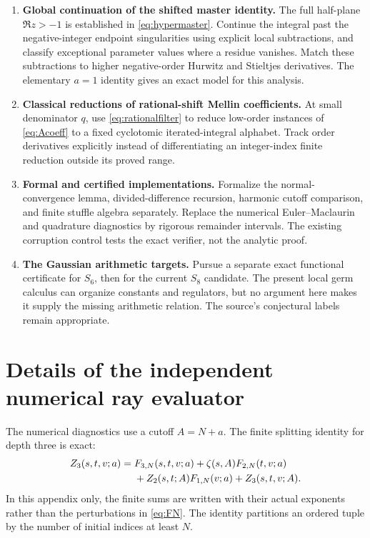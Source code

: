 \documentclass[11pt,a4paper]{article}
\numberwithin{equation}{section}
\theoremstyle{definition}\newtheorem{definition}[theorem]{Definition}
\theoremstyle{remark}\newtheorem{remark}[theorem]{Remark}
\begin{document}
\begin{enumerate}[label=\textbf{Q\arabic*.},itemsep=9pt]
\item \textbf{Global continuation of the shifted master identity.}
The full half-plane $\Re z>-1$ is established in
\eqref{eq:hypermaster}. Continue the integral past the negative-integer
endpoint singularities using explicit local subtractions, and classify
exceptional parameter values where a residue vanishes. Match these
subtractions to higher negative-order Hurwitz and Stieltjes derivatives.
The elementary $a=1$ identity gives an exact model for this analysis.

\item \textbf{Classical reductions of rational-shift Mellin coefficients.}
At small denominator $q$, use \eqref{eq:rationalfilter} to reduce low-order
instances of \eqref{eq:Acoeff} to a fixed cyclotomic iterated-integral
alphabet. Track order derivatives explicitly instead of differentiating
an integer-index finite reduction outside its proved range.

\item \textbf{Formal and certified implementations.} Formalize the
normal-convergence lemma, divided-difference recursion, harmonic cutoff
comparison, and finite stuffle algebra separately. Replace the numerical
Euler--Maclaurin and quadrature diagnostics by rigorous remainder
intervals. The existing corruption control tests the exact verifier,
not the analytic proof.

\item \textbf{The Gaussian arithmetic targets.} Pursue a separate exact
functional certificate for $S_6$, then for the current $S_8$ candidate.
The present local germ calculus can organize constants and regulators,
but no argument here makes it supply the missing arithmetic relation.
The source's conjectural labels remain appropriate.
\end{enumerate}

\appendix
\section{Details of the independent numerical ray evaluator}
\label{app:numerical}

The numerical diagnostics use a cutoff $A=N+a$. The finite splitting
identity for depth three is exact:
\begin{align}\label{eq:split}
 Z_3(s,t,v;a)={}&F_{3,N}(s,t,v;a)
 +\zeta(s,A)F_{2,N}(t,v;a)\notag\\
 &+Z_2(s,t;A)F_{1,N}(v;a)+Z_3(s,t,v;A).
\end{align}
In this appendix only, the finite sums are written with their actual
exponents rather than the perturbations in \eqref{eq:FN}. The identity
partitions an ordered tuple by the number of initial indices at least
$N$.
\end{document}
